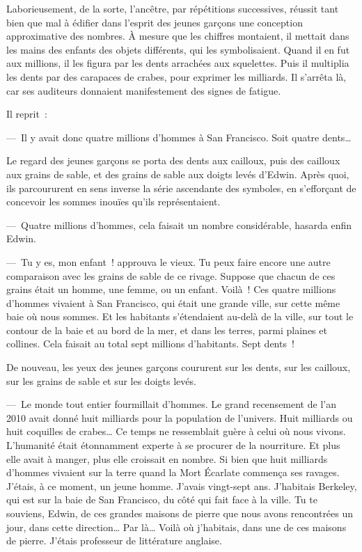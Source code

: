 \documentclass[french,twoside]{book} %
\begin{document}
Laborieusement, de la sorte, l’ancêtre, par répétitions successives, réussit tant bien que mal à édifier dans l’esprit des jeunes garçons une conception approximative des nombres. À mesure que les chiffres montaient, il mettait dans les mains des enfants des objets différents, qui les symbolisaient. Quand il en fut aux millions, il les figura par les dents arrachées aux squelettes. Puis il multiplia les dents par des carapaces de crabes, pour exprimer les milliards. Il s’arrêta là, car ses auditeurs donnaient manifestement des signes de fatigue.\par
Il reprit :\par
— Il y avait donc quatre millions d’hommes à San Francisco. Soit quatre dents…\par
Le regard des jeunes garçons se porta des dents aux cailloux, puis des cailloux aux grains de sable, et des grains de sable aux doigts levés d’Edwin. Après quoi, ils parcoururent en sens inverse la série ascendante des symboles, en s’efforçant de concevoir les sommes inouïes qu’ils représentaient.\par
— Quatre millions d’hommes, cela faisait un nombre considérable, hasarda enfin Edwin.\par
— Tu y es, mon enfant ! approuva le vieux. Tu peux faire encore une autre comparaison avec les grains de sable de ce rivage. Suppose que chacun de ces grains était un homme, une femme, ou un enfant. Voilà ! Ces quatre millions d’hommes vivaient à San Francisco, qui était une grande ville, sur cette même baie où nous sommes. Et les habitants s’étendaient au-delà de la ville, sur tout le contour de la baie et au bord de la mer, et dans les terres, parmi plaines et collines. Cela faisait au total sept millions d’habitants. Sept dents !\par
De nouveau, les yeux des jeunes garçons coururent sur les dents, sur les cailloux, sur les grains de sable et sur les doigts levés.\par
— Le monde tout entier fourmillait d’hommes. Le grand recensement de l’an 2010 avait donné huit milliards pour la population de l’univers. Huit milliards ou huit coquilles de crabes… Ce temps ne ressemblait guère à celui où nous vivons. L’humanité était étonnamment experte à se procurer de la nourriture. Et plus elle avait à manger, plus elle croissait en nombre. Si bien que huit milliards d’hommes vivaient sur la terre quand la Mort Écarlate commença ses ravages. J’étais, à ce moment, un jeune homme. J’avais vingt-sept ans. J’habitais Berkeley, qui est sur la baie de San Francisco, du côté qui fait face à la ville. Tu te souviens, Edwin, de ces grandes maisons de pierre que nous avons rencontrées un jour, dans cette direction… Par là… Voilà où j’habitais, dans une de ces maisons de pierre. J’étais professeur de littérature anglaise.\par
\end{document}
